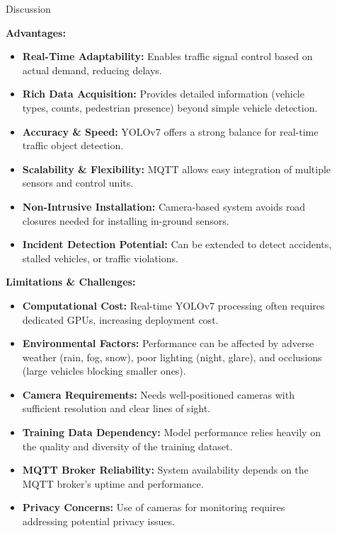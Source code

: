 \documentclass[final]{beamer}
\newlength{\sepwidth}
\newlength{\colwidth}
\newcommand{\separatorcolumn}{\begin{column}{\sepwidth}\end{column}}
\begin{document}
\begin{frame}[t]
\begin{columns}[t]
\begin{column}{\colwidth}
  \vfill

\end{column}

\separatorcolumn

\begin{column}{\colwidth}

  \begin{block}{Discussion}
   
    \textbf{Advantages:}
    \begin{itemize}
      \item \textbf{Real-Time Adaptability:} Enables traffic signal control based on actual demand, reducing delays.
      \item \textbf{Rich Data Acquisition:} Provides detailed information (vehicle types, counts, pedestrian presence) beyond simple vehicle detection.
      \item \textbf{Accuracy \& Speed:} YOLOv7 offers a strong balance for real-time traffic object detection.
      \item \textbf{Scalability \& Flexibility:} MQTT allows easy integration of multiple sensors and control units.
      \item \textbf{Non-Intrusive Installation:} Camera-based system avoids road closures needed for installing in-ground sensors.
      \item \textbf{Incident Detection Potential:} Can be extended to detect accidents, stalled vehicles, or traffic violations.
    \end{itemize}

    \textbf{Limitations \& Challenges:}
    \begin{itemize}
      \item \textbf{Computational Cost:} Real-time YOLOv7 processing often requires dedicated GPUs, increasing deployment cost.
      \item \textbf{Environmental Factors:} Performance can be affected by adverse weather (rain, fog, snow), poor lighting (night, glare), and occlusions (large vehicles blocking smaller ones).
      \item \textbf{Camera Requirements:} Needs well-positioned cameras with sufficient resolution and clear lines of sight.
      \item \textbf{Training Data Dependency:} Model performance relies heavily on the quality and diversity of the training dataset.
      \item \textbf{MQTT Broker Reliability:} System availability depends on the MQTT broker's uptime and performance.
      \item \textbf{Privacy Concerns:} Use of cameras for monitoring requires addressing potential privacy issues.
    \end{itemize}


\end{block}
\end{column}
\end{columns}
\end{frame}
\end{document}
